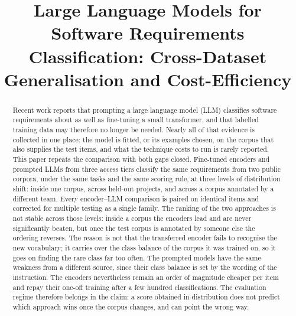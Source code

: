 \documentclass[conference]{IEEEtran}
\begin{document}
\title{Large Language Models for Software Requirements\\Classification:
       Cross-Dataset Generalisation and Cost-Efficiency}

\author{
}

\maketitle

\begin{abstract}
Recent work reports that prompting a large language model (LLM) classifies
software requirements about as well as fine-tuning a small transformer, and that
labelled training data may therefore no longer be needed. Nearly all of that
evidence is collected in one place: the model is fitted, or its examples chosen,
on the corpus that also supplies the test items, and what the technique costs to
run is rarely reported. This paper repeats the comparison with both gaps closed.
Fine-tuned encoders and prompted LLMs from three access tiers classify the same
requirements from two public corpora, under the same tasks and the same scoring
rule, at three levels of distribution shift: inside one corpus, across held-out
projects, and across a corpus annotated by a different team. Every encoder--LLM
comparison is paired on identical items and corrected for multiple testing as a
single family. The ranking of the two approaches is not stable across those
levels: inside a corpus the encoders lead and are never significantly beaten,
but once the test corpus is annotated by someone else the ordering reverses. The
reason is not that the transferred encoder fails to recognise the new
vocabulary; it carries over the class balance of the corpus it was trained on,
so it goes on finding the rare class far too often. The prompted models have the
same weakness from a different source, since their class balance is set by the
wording of the instruction. The encoders nevertheless remain an order of
magnitude cheaper per item and repay their one-off training after a few hundred
classifications. The evaluation regime therefore belongs in the claim: a score
obtained in-distribution does not predict which approach wins once the corpus
changes, and can point the wrong way.
\end{abstract}
\end{document}
